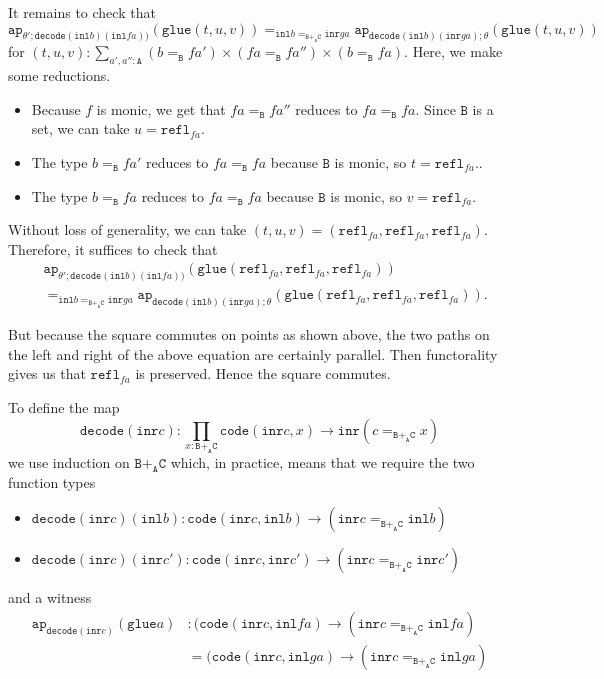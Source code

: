 \message{ !name(notes.tex)}\documentclass[12pt]{amsart}
\newcommand{\from}{\colon}
\newcommand{\type}[1]{\mathtt{#1}}
\newcommand{\tin}{\colon}
\newcommand{\A}{\type{A}}
\newcommand{\B}{\type{B}}
\newcommand{\C}{\type{C}}
\newcommand{\BAC}{\B +_{\A} \C}
\newcommand{\ap}{\type{ap}}
\newcommand{\inl}{\type{inl}}
\newcommand{\inr}{\type{inr}}
\newcommand{\glue}{\type{glue}}
\newcommand{\refl}{\type{refl}}
\newcommand{\code}{\type{code}}
\newcommand{\decode}{\type{decode}}
\theoremstyle{remark}
\theoremstyle{definition}
\begin{document}
It remains to check that
\[
  \ap_{\theta' ; \decode (\inl b ) ( \inl fa ) )} ( \glue ( t,u,v ) ) 
  =_{ \inl b =_{\BAC} \inr ga }
  \ap_{ \decode ( \inl b )(\inr ga) ; \theta } ( \glue ( t,u,v ) ) 
\]
for
\(
  ( t,u,v ) \tin
  \sum\limits_{a',a''\tin \A}
  ( b =_\B fa' ) \times ( fa =_\B fa'' ) \times ( b =_{\B} fa ).
\)
Here, we make some reductions.
%
\begin{itemize}
\item
  Because \( f \) is monic, we get that
  \(
    fa =_\B fa''
  \)
  reduces to
  \(
    fa =_\B fa.
  \)
  Since \( \B \) is a set, we can take
  \(
    u = \refl_{fa}.
  \)
\item
  The type
  \(
    b =_\B fa'
  \)
  reduces to
  \(
    fa =_\B fa
  \)
  because \( \B \)
  is monic, so
  \(
    t = \refl_{fa}.
  \).
\item
  The type
  \(
    b =_\B fa
  \)
  reduces to
  \(
    fa =_\B fa
  \)
  because \( \B \) is monic, so
  \(
    v = \refl_{fa}.
  \)
\end{itemize}
%
Without loss of generality, we can take
\(
  ( t,u,v ) = ( \refl_{fa},\refl_{fa},\refl_{fa} ).
\)
Therefore, it suffices to check that 
\begin{align*}
%
   & \ap_{\theta' ; \decode (\inl b ) ( \inl fa ) )}
   ( \glue ( \refl_{fa},\refl_{fa},\refl_{fa} ) ) \\
        & =_{ \inl b =_{\BAC} \inr ga }
        \ap_{ \decode ( \inl b )( \inr ga ) ; \theta }
        ( \glue  ( \refl_{fa},\refl_{fa},\refl_{fa} ) ). 
% 
\end{align*}
  
But because the square commutes on points as shown above, the two
paths on the left and right of the above equation are certainly
parallel.  Then functorality gives us that \( \refl_{fa} \) is
preserved. Hence the square commutes.


To define the map
\[
  \decode ( \inr c ) \from
  \prod\limits_{x \tin \BAC}
  \code ( \inr c , x ) \to \inr ( c =_{\BAC} x )
\]
we use induction on \( \BAC \) which, in practice, means that we
require the two function types
%
\begin{itemize}
\item
  \(
    \decode ( \inr c ) ( \inl b ) \from
      \code (\inr c , \inl b) \to
      ( \inr c =_{\BAC} \inl b )
  \)
\item
  \(
    \decode ( \inr c ) ( \inr c' ) \from
      \code ( \inr c , \inr c' ) \to
      ( \inr c =_{\BAC} \inr c' )
  \) 
\end{itemize}
%
and a witness
%
\begin{align*}
  \ap_{\decode ( \inr c ) } (\glue a) & \tin
  ( \code ( \inr c , \inl fa ) \to ( \inr c =_{\BAC} \inl fa ) \\
  & = ( \code ( \inr c , \inl ga ) \to ( \inr c =_{\BAC} \inl ga )
\end{align*}
\end{document}
